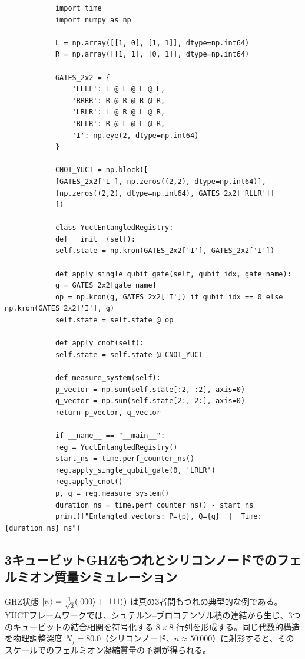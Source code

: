 \documentclass[11pt,a4paper]{article}
\begin{document}
	\begin{tcolorbox}[title=YUCT CNOTもつれエミュレータ（Python）, breakable]
		\begin{lstlisting}
			import time
			import numpy as np
			
			L = np.array([[1, 0], [1, 1]], dtype=np.int64)
			R = np.array([[1, 1], [0, 1]], dtype=np.int64)
			
			GATES_2x2 = {
				'LLLL': L @ L @ L @ L,
				'RRRR': R @ R @ R @ R,
				'LRLR': L @ R @ L @ R,
				'RLLR': R @ L @ L @ R,
				'I': np.eye(2, dtype=np.int64)
			}
			
			CNOT_YUCT = np.block([
			[GATES_2x2['I'], np.zeros((2,2), dtype=np.int64)],
			[np.zeros((2,2), dtype=np.int64), GATES_2x2['RLLR']]
			])
			
			class YuctEntangledRegistry:
			def __init__(self):
			self.state = np.kron(GATES_2x2['I'], GATES_2x2['I'])
			
			def apply_single_qubit_gate(self, qubit_idx, gate_name):
			g = GATES_2x2[gate_name]
			op = np.kron(g, GATES_2x2['I']) if qubit_idx == 0 else np.kron(GATES_2x2['I'], g)
			self.state = self.state @ op
			
			def apply_cnot(self):
			self.state = self.state @ CNOT_YUCT
			
			def measure_system(self):
			p_vector = np.sum(self.state[:2, :2], axis=0)
			q_vector = np.sum(self.state[2:, 2:], axis=0)
			return p_vector, q_vector
			
			if __name__ == "__main__":
			reg = YuctEntangledRegistry()
			start_ns = time.perf_counter_ns()
			reg.apply_single_qubit_gate(0, 'LRLR')
			reg.apply_cnot()
			p, q = reg.measure_system()
			duration_ns = time.perf_counter_ns() - start_ns
			print(f"Entangled vectors: P={p}, Q={q}  |  Time: {duration_ns} ns")
		\end{lstlisting}
	\end{tcolorbox}
	
	\subsection{3キュービットGHZもつれとシリコンノードでのフェルミオン質量シミュレーション}
	
	GHZ状態 \(\ket{\psi} = \frac{1}{\sqrt{2}}(\ket{000} + \ket{111})\) は真の3者間もつれの典型的な例である。YUCTフレームワークでは、シュテルン–ブロコテンソル積の連結から生じ、3つのキュービットの結合相関を符号化する \(8\times 8\) 行列を形成する。同じ代数的構造を物理調整深度 \(N_f = 80.0\)（シリコンノード、\(n \approx 50\,000\)）に射影すると、そのスケールでのフェルミオン凝縮質量の予測が得られる。
	
\end{document}

